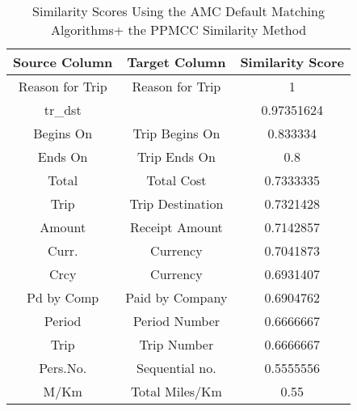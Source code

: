 \begin{table}[ht]
\centering
\begin{tabular}{|c|c|c|}
\hline
{\bf Source Column} & {\bf Target Column} & {\bf Similarity Score} \\ \hline
Reason for Trip                & Reason for Trip                & 1                                 \\ \hline
tr\_dst                        &                                & 0.97351624                        \\ \hline
Begins On                      & Trip Begins On                 & 0.833334                          \\ \hline
Ends On                        & Trip Ends On                   & 0.8                               \\ \hline
Total                          & Total Cost                     & 0.7333335                         \\ \hline
Trip                           & Trip Destination               & 0.7321428                         \\ \hline
Amount                         & Receipt Amount                 & 0.7142857                         \\ \hline
Curr.                          & Currency                       & 0.7041873                         \\ \hline
Crcy                           & Currency                       & 0.6931407                         \\ \hline
Pd by Comp                     & Paid by Company                & 0.6904762                         \\ \hline
Period                         & Period Number                  & 0.6666667                         \\ \hline
Trip                           & Trip Number                    & 0.6666667                         \\ \hline
Pers.No.                       & Sequential no.                 & 0.5555556                         \\ \hline
M/Km                           & Total Miles/Km                 & 0.55                              \\ \hline
\end{tabular}
\caption{Similarity Scores Using the AMC Default Matching Algorithms+  the PPMCC Similarity Method}
\label{tab:Similarity_Scores_Using_the_AMC_Default_Matching_Algorithms+__the_PPMCC_Similarity_Method}
\end{table}

